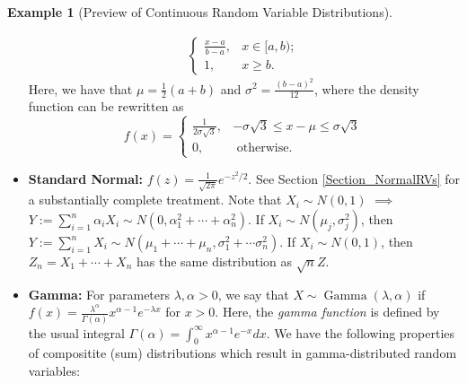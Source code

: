 \documentclass[12pt,reqno]{article}
\renewcommand{\emph}[1]{\textit{#1}}
\theoremstyle{plain}
\theoremstyle{definition}
\newtheorem{example}[theorem]{Example}
\begin{document}
\begin{example}[Preview of Continuous Random Variable Distributions]
\begin{itemize}
\begin{align*}
\begin{cases}
           \frac{x-a}{b-a}, & x \in [a,b); \\ 
           1, & x \geq b. 
           \end{cases} 
     \end{align*} 
     Here, we have that $\mu = \frac{1}{2}(a+b)$ and 
     $\sigma^2 = \frac{(b-a)^2}{12}$, where the density function can be 
     rewritten as 
     \[
     f(x) = \begin{cases} 
          \frac{1}{2\sigma\sqrt{3}}, & -\sigma\sqrt{3} \leq x-\mu \leq 
               \sigma\sqrt{3} \\ 
          0, & \text{ otherwise. }
          \end{cases} 
     \]
\item \textbf{Standard Normal:} $f(z) = \frac{1}{\sqrt{2\pi}} e^{-z^2 / 2}$. 
     See Section \ref{Section_NormalRVs} for a substantially complete treatment. 
     Note that $X_i \sim N(0, 1)$ $\implies$ 
     $Y := \sum_{i=1}^n \alpha_i X_i \sim N(0, \alpha_1^2+\cdots+\alpha_n^2)$. 
     If $X_i \sim N(\mu_j, \sigma_j^2)$, then 
     $Y := \sum_{i=1}^n X_i \sim N(\mu_1+\cdots+\mu_n, \sigma_1^2+\cdots\sigma_n^2)$. 
     If $X_i \sim N(0, 1)$, then $Z_n = X_1+\cdots+X_n$ has the same 
     distribution as $\sqrt{n} Z$. 
\item \textbf{Gamma:} For parameters $\lambda,\alpha > 0$, we say that 
     $X \sim \operatorname{Gamma}(\lambda, \alpha)$ if 
     $f(x) = \frac{\lambda^{\alpha}}{\Gamma(\alpha)} x^{\alpha-1} 
      e^{-\lambda x}$ for $x > 0$. Here, the \emph{gamma function} is 
     defined by the usual integral 
     $\Gamma(\alpha) = \int_0^{\infty} x^{\alpha-1} e^{-x} dx$. 
     We have the following properties of compositite (sum) distributions 
     which result in gamma-distributed random variables: 
     \begin{itemize} 
     

\end{itemize}
\end{itemize}
\end{example}
\end{document}
